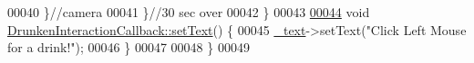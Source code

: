 \begin{DoxyCode}
00040             \}\textcolor{comment}{//camera}
00041         \}\textcolor{comment}{//30 sec over}
00042     \}
00043 
\hypertarget{_drunken_interaction_callback_8cpp_source_l00044}{}\hyperlink{classbrtr_1_1_drunken_interaction_callback_a71b86fc410bf2965ca998eff1350cfaf}{00044}     \textcolor{keywordtype}{void} \hyperlink{classbrtr_1_1_drunken_interaction_callback_a71b86fc410bf2965ca998eff1350cfaf}{DrunkenInteractionCallback::setText}() \{
00045         \hyperlink{classbrtr_1_1_base_interaction_callback_af60dece4300b09fafe3c048397122cbd}{\_text}->setText(\textcolor{stringliteral}{"Click Left Mouse for a drink!"});
00046     \}
00047 
00048 \}
00049 
\end{DoxyCode}
